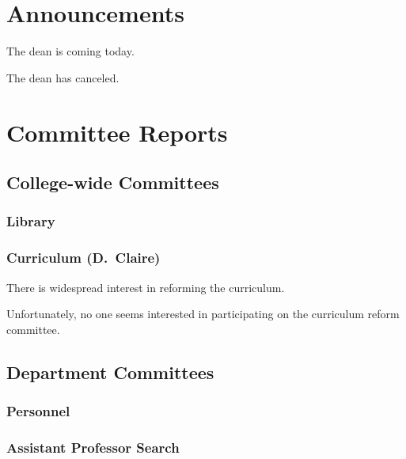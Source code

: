 \documentclass[11pt,chair]{meetingmins}
\begin{document}
\maketitle

\section{Announcements}
\begin{hiddenitems}
\item
The dean is coming today.

\item
The dean has canceled.

\end{hiddenitems}

\section{Committee Reports}

\subsection{College-wide Committees}
\subsubsection{Library}

\subsubsection{Curriculum {\rm (D.~Claire)}}
\begin{hiddensubitems}
\item
There is widespread interest in reforming the curriculum.

\item
Unfortunately, no one seems interested in participating on the
curriculum reform committee.
\end{hiddensubitems}

\subsection{Department Committees}
\subsubsection{Personnel}

\subsubsection{Assistant Professor Search}
\end{document}
